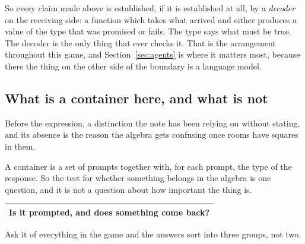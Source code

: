 \documentclass[11pt,a4paper]{article}
\begin{document}
So every claim made above is established, if it is established at all, by a \emph{decoder} on the
receiving side: a function which takes what arrived and either produces a value of the type that
was promised or fails. The type says what must be true. The decoder is the only thing that ever
checks it. That is the arrangement throughout this game, and Section~\ref{sec:agents} is where it
matters most, because there the thing on the other side of the boundary is a language model.

\subsection{What is a container here, and what is not}
\label{sec:roles}

Before the expression, a distinction the note has been relying on without stating, and its absence
is the reason the algebra gets confusing once rooms have squares in them.

A container is a set of prompts together with, for each prompt, the type of the response. So the
test for whether something belongs in the algebra is one question, and it is not a question about
how important the thing is.

\begin{center}
\begin{tabular}{@{}>{\raggedright\arraybackslash}p{}@{}}
\toprule
\textbf{Is it prompted, and does something come back?} \\
\bottomrule
\end{tabular}
\end{center}

Ask it of everything in the game and the answers sort into three groups, not two.
\end{document}
